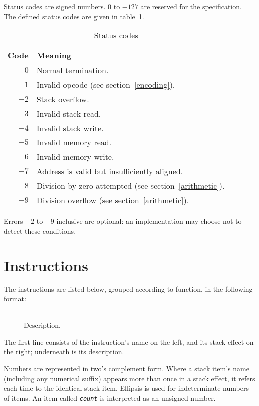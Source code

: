 \documentclass[a4paper]{article}
\newcommand{\spic}[1]{\texttt{\slshape{#1\/}}}
\newlength{\itemwidth}\itemwidth=\textwidth \advance\itemwidth by -0.1in
\newlength{\instname}\instname=0.8in
\newlength{\stackcom}\stackcom=3.7in
\newcommand{\instprim}[3]{\item[]\parbox{\itemwidth}%
{\makebox[\instname][l]{\tt #1}%
\makebox[\stackcom][r]{\spic{\pbox[t]{\stackcom}{#2}}}\\[0.5ex]#3}}
\newcommand{\inst}[4]{\instprim{#1}{\tt …#2 → …#3}{#4}}
\begin{document}
Status codes are signed numbers. $0$ to $-127$ are reserved for the specification. The defined status codes are given in table~\ref{statustable}.

\begin{table}[htb]
\begin{center}
\begin{tabular}{rp{4in}} \toprule
\bf Code & \bf Meaning \\ \midrule
$0$ & Normal termination. \\
$-1$ & Invalid opcode (see section~\ref{encoding}). \\
$-2$ & Stack overflow. \\
$-3$ & Invalid stack read. \\
$-4$ & Invalid stack write. \\
$-5$ & Invalid memory read. \\
$-6$ & Invalid memory write. \\
$-7$ & Address is valid but insufficiently aligned. \\
$-8$ & Division by zero attempted (see section~\ref{arithmetic}). \\
$-9$ & Division overflow (see section~\ref{arithmetic}). \\
 \bottomrule
\end{tabular}
\caption{\label{statustable}Status codes}
\end{center}
\end{table}

\noindent Errors $-2$ to $-9$ inclusive are optional: an implementation may choose not to detect these conditions.


\section{Instructions}

The instructions are listed below, grouped according to function, in the following format:

\begin{description}
\inst{NAME}{before}{after}{Description.}
\end{description}

\noindent The first line consists of the instruction’s name on the left, and its stack effect on the right; underneath is its description.

Numbers are represented in two’s complement form. Where a stack item’s name (including any numerical suffix) appears more than once in a stack effect, it refers each time to the identical stack item. Ellipsis is used for indeterminate numbers of items. An item called \spic{count} is interpreted as an unsigned number.
\end{document}
